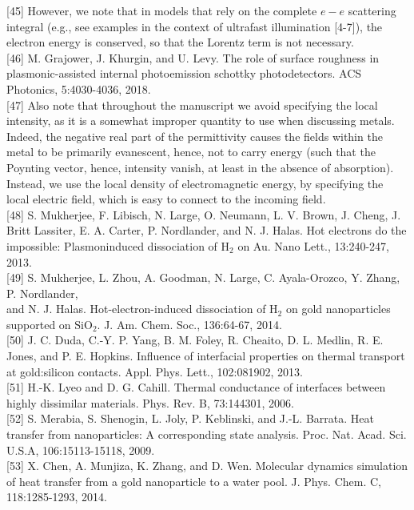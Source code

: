 \documentclass[10pt]{article}
\begin{document}
[45] However, we note that in models that rely on the complete $e-e$ scattering integral (e.g., see examples in the context of ultrafast illumination [4-7]), the electron energy is conserved, so that the Lorentz term is not necessary.\\[0pt]
[46] M. Grajower, J. Khurgin, and U. Levy. The role of surface roughness in plasmonic-assisted internal photoemission schottky photodetectors. ACS Photonics, 5:4030-4036, 2018.\\[0pt]
[47] Also note that throughout the manuscript we avoid specifying the local intensity, as it is a somewhat improper quantity to use when discussing metals. Indeed, the negative real part of the permittivity causes the fields within the metal to be primarily evanescent, hence, not to carry energy (such that the Poynting vector, hence, intensity vanish, at least in the absence of absorption). Instead, we use the local density of electromagnetic energy, by specifying the local electric field, which is easy to connect to the incoming field.\\[0pt]
[48] S. Mukherjee, F. Libisch, N. Large, O. Neumann, L. V. Brown, J. Cheng, J. Britt Lassiter, E. A. Carter, P. Nordlander, and N. J. Halas. Hot electrons do the impossible: Plasmoninduced dissociation of $\mathrm{H}_{2}$ on Au. Nano Lett., 13:240-247, 2013.\\[0pt]
[49] S. Mukherjee, L. Zhou, A. Goodman, N. Large, C. Ayala-Orozco, Y. Zhang, P. Nordlander,\\
and N. J. Halas. Hot-electron-induced dissociation of $\mathrm{H}_{2}$ on gold nanoparticles supported on $\mathrm{SiO}_{2}$. J. Am. Chem. Soc., 136:64-67, 2014.\\[0pt]
[50] J. C. Duda, C.-Y. P. Yang, B. M. Foley, R. Cheaito, D. L. Medlin, R. E. Jones, and P. E. Hopkins. Influence of interfacial properties on thermal transport at gold:silicon contacts. Appl. Phys. Lett., 102:081902, 2013.\\[0pt]
[51] H.-K. Lyeo and D. G. Cahill. Thermal conductance of interfaces between highly dissimilar materials. Phys. Rev. B, 73:144301, 2006.\\[0pt]
[52] S. Merabia, S. Shenogin, L. Joly, P. Keblinski, and J.-L. Barrata. Heat transfer from nanoparticles: A corresponding state analysis. Proc. Nat. Acad. Sci. U.S.A, 106:15113-15118, 2009.\\[0pt]
[53] X. Chen, A. Munjiza, K. Zhang, and D. Wen. Molecular dynamics simulation of heat transfer from a gold nanoparticle to a water pool. J. Phys. Chem. C, 118:1285-1293, 2014.\\[0pt]
\end{document}
